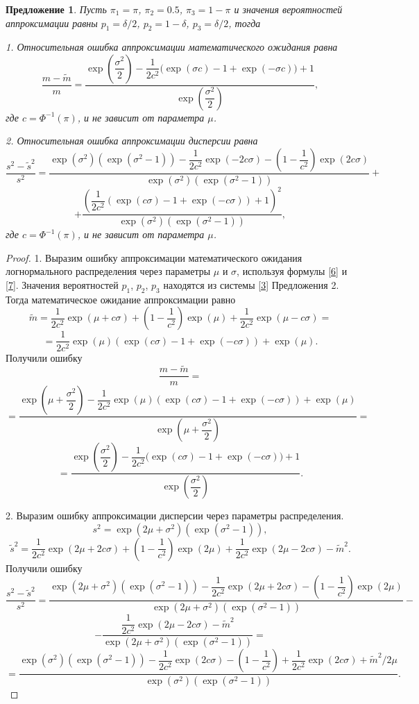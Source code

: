 \documentclass[specialist, substylefile = spbu.rtx,
subf,href,colorlinks=true, 12pt]{disser}
\newtheorem{proposition}[theorem]{Предложение}
\begin{document}
	\begin{proposition}\label{pr7}
		Пусть $\pi_{1} = \pi$, $\pi_{2} = 0.5$, $\pi_{3} = 1-\pi$ и значения вероятностей аппроксимации равны $p_{1} = \delta/2$, $p_{2} = 1-\delta$, $p_{3} = \delta/2$, тогда
		
		1. Относительная ошибка аппроксимации математического ожидания равна
		\[\dfrac{ m - \widetilde{m} }{m}  = \dfrac{\exp\left(\dfrac{\sigma^{2}}{2}\right) - \dfrac{1}{2c^{2}}\bigg(\exp(\sigma c)-1 +\exp(-\sigma c)\bigg) + 1}{\exp\left(\dfrac{\sigma^{2}}{2}\right)},\]
		где $c = \Phi^{-1}(\pi)$, и не зависит от параметра $\mu$.
		
		2. Относительная ошибка аппроксимации дисперсии равна
		\[\dfrac{ s^{2} - \widetilde{s}^{2} }{s^{2}} = \dfrac{\exp(\sigma^{2})(\exp(\sigma^{2}-1)) - \dfrac{1}{2c^{2}}\exp(-2c\sigma)- \left( 1- \dfrac{1}{c^{2}}\right) \exp(2c\sigma)}{\exp(\sigma^{2})(\exp(\sigma^{2}-1))}+\]\[+ \dfrac{\left( \dfrac{1}{2c^{2}}(\exp(c\sigma)-1+\exp(-c\sigma)) + 1\right) ^{2}}{\exp(\sigma^{2})(\exp(\sigma^{2}-1))},\]
		где $c = \Phi^{-1}(\pi)$, и не зависит от параметра $\mu$.
		
	\end{proposition}
	\begin{proof}
		1. Выразим ошибку аппроксимации математического ожидания логнормального распределения через параметры $\mu$ и $\sigma$, используя формулы \eqref{6} и \eqref{7}. Значения вероятностей $p_{1}$, $p_{2}$, $p_{3}$ находятся из системы \eqref{3} Предложения 2. Тогда математическое ожидание аппроксимации равно
		\[\tilde{m} = \dfrac{1}{2c^{2}}\exp(\mu+c\sigma)+\left(1 - \dfrac{1}{c^{2}}\right)\exp(\mu)+ \dfrac{1}{2c^{2}}\exp(\mu-c\sigma)=\]
		\[= \dfrac{1}{2c^{2}} \exp(\mu)(\exp(c\sigma )-1+\exp(-c\sigma)) + \exp(\mu). \]
		Получили ошибку
		\[\dfrac{ m - \widetilde{m} }{m} = \]\[=\dfrac{ \exp\left(\mu+\dfrac{\sigma^{2}}{2}\right) - \dfrac{1}{2c^{2}} \exp(\mu)(\exp(c\sigma)-1 +\exp(-c\sigma)) + \exp(\mu) }{\exp\left(\mu+\dfrac{\sigma^{2}}{2}\right)}=\]
		\[=\dfrac{\exp\left(\dfrac{\sigma^{2}}{2}\right) - \dfrac{1}{2c^{2}} \bigg(\exp(c\sigma )-1 +\exp(-c\sigma)\bigg) + 1}{\exp\left(\dfrac{\sigma^{2}}{2}\right)}.\]
		
		2. Выразим ошибку аппроксимации дисперсии через параметры распределения.
		\[s^{2} = \exp(2\mu+\sigma^{2})(\exp(\sigma^{2}-1)),\]
		\[\tilde{s}^{2} = \dfrac{1}{2c^{2}}\exp(2\mu+2c\sigma)+\left(1 - \dfrac{1}{c^{2}}\right)\exp(2\mu)+ \dfrac{1}{2c^{2}}\exp(2\mu-2c\sigma) - \tilde{m}^{2}.\]
		Получили ошибку
		\[\dfrac{s^{2} - \widetilde{s}^{2}}{s^{2}} = \dfrac{\exp(2\mu+\sigma^{2})(\exp(\sigma^{2}-1)) - \dfrac{1}{2c^{2}}\exp(2\mu+2c\sigma)- \left(1 - \dfrac{1}{c^{2}}\right)\exp(2\mu)}{\exp(2\mu+\sigma^{2})(\exp(\sigma^{2}-1))}-\]
		\[-\dfrac{\dfrac{1}{2c^{2}}\exp(2\mu-2c\sigma) - \tilde{ m}^{2}}{\exp(2\mu+\sigma^{2})(\exp(\sigma^{2}-1))}=\]
		\[= \dfrac{\exp(\sigma^{2})(\exp(\sigma^{2}-1)) - \dfrac{1}{2c^{2}}\exp(2c\sigma)- \left(1 - \dfrac{1}{c^{2}}\right)+\dfrac{1}{2c^{2}}\exp(2c\sigma) + \tilde{m}^{2}/2\mu}{\exp(\sigma^{2})(\exp(\sigma^{2}-1))}.\]
	\end{proof}
	
\end{document}
